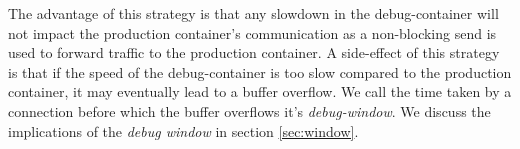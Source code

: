 The advantage of this strategy is that any slowdown in the debug-container will not impact the production container's communication as a non-blocking send is used to forward traffic to the production container. 
A side-effect of this strategy is that if the speed of the debug-container is too slow compared to the production container, it may eventually lead to a buffer overflow. 
We call the time taken by a connection before which the buffer overflows it's \emph{debug-window}.
We discuss the implications of the \emph{debug window} in section \ref{sec:window}.  







\iffalse

